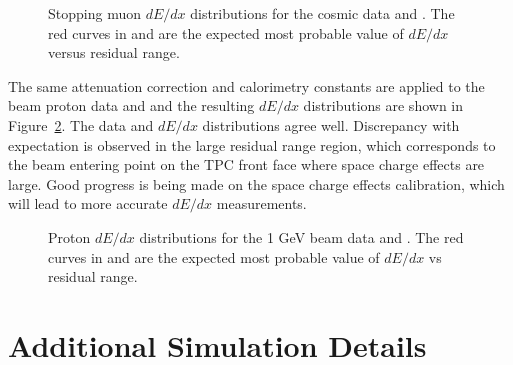 \begin{figure}[!ht]   %
\centering
{}
\caption[Stopping muon $dE/dx$ distributions for the ProtoDUNE-SP cosmic data and MC]{Stopping muon $dE/dx$ distributions for the  cosmic data and . The red curves in \protect{} and \protect{} are the expected most probable value of $dE/dx$ versus residual range.}
\label{fig:pandora_protodune_mu}
\end{figure}

The same attenuation correction and calorimetry constants are applied to the beam proton data and  and the resulting $dE/dx$ distributions are shown in Figure~\ref{fig:pandora_protodune_proton}. The data and  $dE/dx$ distributions agree well. Discrepancy with expectation is observed in the large residual range region, which corresponds to the beam entering point on the TPC front face where space charge effects are large. Good progress is being made on the space charge effects calibration, which will lead to more accurate $dE/dx$ measurements.
\begin{figure}[!ht]  %
\centering
{}
\caption[Proton $dE/dx$ distributions for the ProtoDUNE-SP 1 GeV beam data and MC]{Proton $dE/dx$ distributions for the  1 GeV beam data and . The red curves in \protect{} and \protect{} are the expected most probable value of $dE/dx$ vs residual range.}
\label{fig:pandora_protodune_proton}
\end{figure}


\clearpage



\section{Additional Simulation Details}

